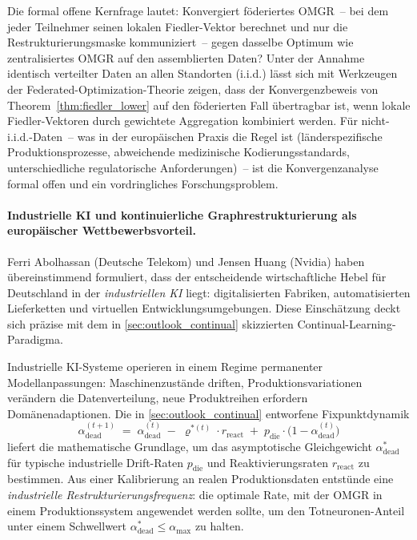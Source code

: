 ﻿\documentclass[12pt, a4paper, openany]{report}
\begin{document}
Die formal offene Kernfrage lautet: Konvergiert föderiertes
OMGR~-- bei dem jeder Teilnehmer seinen lokalen Fiedler-Vektor
berechnet und nur die Restrukturierungsmaske kommuniziert~-- gegen
dasselbe Optimum wie zentralisiertes OMGR auf den assemblierten Daten?
Unter der Annahme identisch verteilter Daten an allen Standorten
(i.i.d.) lässt sich mit Werkzeugen der Federated-Optimization-Theorie
zeigen, dass der Konvergenzbeweis von Theorem~\ref{thm:fiedler_lower}
auf den föderierten Fall übertragbar ist, wenn lokale Fiedler-Vektoren
durch gewichtete Aggregation kombiniert werden.  Für
nicht-i.i.d.-Daten~-- was in der europäischen Praxis die Regel ist
(länderspezifische Produktionsprozesse, abweichende medizinische
Kodierungsstandards, unterschiedliche regulatorische Anforderungen)~--
ist die Konvergenzanalyse formal offen und ein vordringliches
Forschungsproblem.

\paragraph{Industrielle KI und kontinuierliche Graphrestrukturierung
  als europäischer Wettbewerbsvorteil.}
Ferri Abolhassan (Deutsche Telekom) und Jensen Huang (Nvidia) haben
übereinstimmend formuliert, dass der entscheidende wirtschaftliche
Hebel für Deutschland in der \emph{industriellen KI} liegt:
digitalisierten Fabriken, automatisierten Lieferketten und virtuellen
Entwicklungsumgebungen.  Diese Einschätzung deckt sich präzise mit dem
in \cref{sec:outlook_continual} skizzierten Continual-Learning-Paradigma.

Industrielle KI-Systeme operieren in einem Regime permanenter
Modellanpassungen: Maschinenzustände driften, Produktionsvariationen
verändern die Datenverteilung, neue Produktreihen erfordern
Domänenadaptionen.  Die in \cref{sec:outlook_continual} entworfene
Fixpunktdynamik
\[
  \alpha_{\mathrm{dead}}^{(t+1)}
  \;=\;
  \alpha_{\mathrm{dead}}^{(t)}
  \;-\; \varrho^{*(t)} \cdot r_{\mathrm{react}}
  \;+\; p_{\mathrm{die}} \cdot \bigl(1 - \alpha_{\mathrm{dead}}^{(t)}\bigr)
\]
liefert die mathematische Grundlage, um das asymptotische Gleichgewicht
$\alpha^*_{\mathrm{dead}}$ für typische industrielle Drift-Raten
$p_{\mathrm{die}}$ und Reaktivierungsraten $r_{\mathrm{react}}$ zu
bestimmen.  Aus einer Kalibrierung an realen Produktionsdaten entstünde
eine \emph{industrielle Restrukturierungsfrequenz}: die optimale Rate,
mit der OMGR in einem Produktionssystem angewendet werden sollte, um
den Totneuronen-Anteil unter einem Schwellwert
$\alpha^*_{\mathrm{dead}} \leq \alpha_{\max}$ zu halten.
\end{document}
